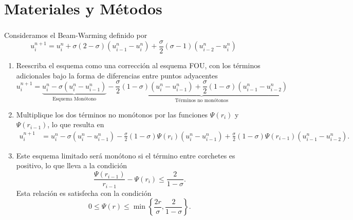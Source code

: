 \section{Materiales y Métodos}

\begin{frame}
	\frametitle{\secname}
	Consideramos el Beam-Warming definido por
	\begin{equation*}
		u_{i}^{n+1}=
		u_{i}^{n}+
		\sigma(2-\sigma)
		\left(u_{i-1}^n-u_i^n\right)+
		\frac{\sigma}{2}(\sigma-1)
		\left(u_{i-2}^{n}-u_{i}^{n}\right)
	\end{equation*}

	\begin{enumerate}
		\item

		      Reescriba el esquema como una corrección al esquema FOU, con los
		      términos adicionales bajo la forma de diferencias entre puntos adyacentes
		      \begin{equation*}
			      u_{i}^{n+1}=
			      \underbrace{
				      u_{i}^{n}-
				      \sigma\left(u_i^n-u_{i-1}^n\right)}_{\text{Esquema Monótono}}-
			      \underbrace{
				      \frac{\sigma}{2}
				      \left(1-\sigma\right)
				      \left(u_{i}^{n}-u_{i-1}^{n}\right)+
				      \frac{\sigma}{2}
				      \left(1-\sigma\right)
				      \left(u_{i-1}^{n}-u_{i-2}^{n}\right)}_{\text {Términos no monótonos}}
		      \end{equation*}

		\item

		      Multiplique los dos términos no monótonos por las funciones
		      $\Psi\left(r_{i}\right)$ y $\Psi\left(r_{i-1}\right)$,
		      lo que resulta en
		      \begin{align*}
			      u_{i}^{n+1} & =
			      u_{i}^{n}-
			      \sigma\left(u_i^n-u_{i-1}^n\right)-
			      \frac{\sigma}{2}
			      \left(1-\sigma\right)
			      \Psi\left(r_{i}\right)
			      \left(u_{i}^{n}-u_{i-1}^{n}\right)+
			      \frac{\sigma}{2}
			      \left(1-\sigma\right)
			      \Psi\left(r_{i-1}\right)
			      \left(u_{i-1}^{n}-u_{i-2}^{n}\right).
		      \end{align*}

		\item
		      Este esquema limitado será monótono si el término entre
		      corchetes es positivo, lo que lleva a la condición
		      \begin{equation*}
			      \frac{\Psi\left(r_{i-1}\right)}{r_{i-1}}-
			      \Psi\left(r_{i}\right)\leq
			      \frac{2}{1-\sigma}.
		      \end{equation*}
		      Esta relación es satisfecha con la condición
		      \begin{equation*}
			      0\leq\Psi\left(r\right)\leq
			      \min\left\{\frac{2r}{\sigma},\frac{2}{1-\sigma}\right\}.
		      \end{equation*}
	\end{enumerate}
\end{frame}

